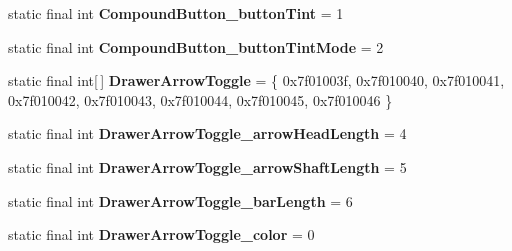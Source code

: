 \begin{DoxyCompactItemize}
\item 
\hypertarget{classandroid_1_1support_1_1v7_1_1appcompat_1_1_r_1_1styleable_ad218170e42fc2d34a654daa377be5365}{}static final int {\bfseries Compound\+Button\+\_\+button\+Tint} = 1\label{classandroid_1_1support_1_1v7_1_1appcompat_1_1_r_1_1styleable_ad218170e42fc2d34a654daa377be5365}

\item 
\hypertarget{classandroid_1_1support_1_1v7_1_1appcompat_1_1_r_1_1styleable_a67ad529a176565bd35892e51d52b2594}{}static final int {\bfseries Compound\+Button\+\_\+button\+Tint\+Mode} = 2\label{classandroid_1_1support_1_1v7_1_1appcompat_1_1_r_1_1styleable_a67ad529a176565bd35892e51d52b2594}

\item 
\hypertarget{classandroid_1_1support_1_1v7_1_1appcompat_1_1_r_1_1styleable_a7bd3ecc07eb763b454c40c0871959a35}{}static final int\mbox{[}$\,$\mbox{]} {\bfseries Drawer\+Arrow\+Toggle} = \{ 0x7f01003f, 0x7f010040, 0x7f010041, 0x7f010042, 0x7f010043, 0x7f010044, 0x7f010045, 0x7f010046 \}\label{classandroid_1_1support_1_1v7_1_1appcompat_1_1_r_1_1styleable_a7bd3ecc07eb763b454c40c0871959a35}

\item 
\hypertarget{classandroid_1_1support_1_1v7_1_1appcompat_1_1_r_1_1styleable_a72cc7e3ed61db5e3d7706bf08e50835a}{}static final int {\bfseries Drawer\+Arrow\+Toggle\+\_\+arrow\+Head\+Length} = 4\label{classandroid_1_1support_1_1v7_1_1appcompat_1_1_r_1_1styleable_a72cc7e3ed61db5e3d7706bf08e50835a}

\item 
\hypertarget{classandroid_1_1support_1_1v7_1_1appcompat_1_1_r_1_1styleable_af4c2d441d3064d37a2503f20ae40dd2a}{}static final int {\bfseries Drawer\+Arrow\+Toggle\+\_\+arrow\+Shaft\+Length} = 5\label{classandroid_1_1support_1_1v7_1_1appcompat_1_1_r_1_1styleable_af4c2d441d3064d37a2503f20ae40dd2a}

\item 
\hypertarget{classandroid_1_1support_1_1v7_1_1appcompat_1_1_r_1_1styleable_a9803c7705602c81b9a1da96464e0f66a}{}static final int {\bfseries Drawer\+Arrow\+Toggle\+\_\+bar\+Length} = 6\label{classandroid_1_1support_1_1v7_1_1appcompat_1_1_r_1_1styleable_a9803c7705602c81b9a1da96464e0f66a}

\item 
\hypertarget{classandroid_1_1support_1_1v7_1_1appcompat_1_1_r_1_1styleable_a778acebe5d0d81bc358d6395592f2f4e}{}static final int {\bfseries Drawer\+Arrow\+Toggle\+\_\+color} = 0\label{classandroid_1_1support_1_1v7_1_1appcompat_1_1_r_1_1styleable_a778acebe5d0d81bc358d6395592f2f4e}


\end{DoxyCompactItemize}
